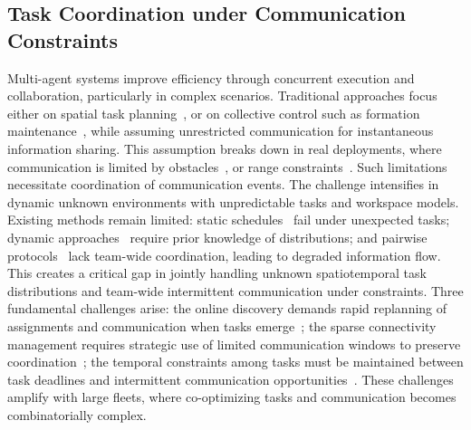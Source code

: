 \subsection{Task Coordination under Communication Constraints}\label{ch01:task-com}
Multi-agent systems improve efficiency through concurrent execution and collaboration,
particularly in complex scenarios. Traditional approaches focus either on spatial task planning~\cite{huang2025novel},
or on collective control such as formation maintenance~\cite{ren2011distributed}, while assuming
unrestricted communication for instantaneous information sharing. This assumption breaks down
in real deployments, where communication is limited by obstacles~\cite{yu2021resilient}, or range
constraints~\cite{da2024communication}.
Such limitations necessitate coordination of communication events. The challenge intensifies in dynamic unknown
environments with unpredictable tasks and workspace models. Existing methods remain limited:
static schedules~\cite{huang2025novel} fail under unexpected tasks; dynamic
approaches~\cite{buyukkocak2021planning} require prior knowledge of distributions; and pairwise
protocols~\cite{aragues2020intermittent} lack team-wide coordination, leading to degraded
information flow. This creates a critical gap in jointly handling unknown spatiotemporal task
distributions and team-wide intermittent communication under constraints.
Three fundamental challenges arise: the {online discovery}
demands rapid replanning of assignments and communication when tasks emerge~\cite{chen2025real};
the {sparse connectivity management} requires
strategic use of limited communication windows to preserve coordination~\cite{saboia2022achord};
{the temporal constraints among tasks must be maintained between task deadlines and intermittent
communication opportunities~\cite{guo2018multirobot}.
These challenges amplify with large fleets,
where co-optimizing tasks and communication becomes combinatorially complex.}






